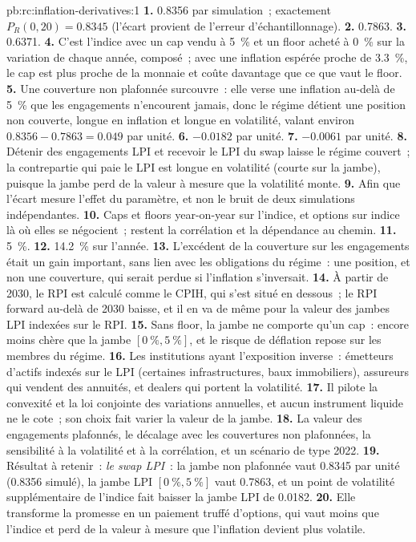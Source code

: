 \begin{solution}{pb:rc:inflation-derivatives:1}
\textbf{1.} 0.8356 par simulation~; exactement $P_R(0,20) = 0.8345$ (l'écart provient de
l'erreur d'échantillonnage).
\textbf{2.} 0.7863.
\textbf{3.} 0.6371.
\textbf{4.} C'est l'indice avec un cap vendu à 5~\% et un floor acheté à 0~\% sur la variation de chaque année,
composé~; avec une inflation espérée proche de 3.3~\%, le cap est plus proche de la monnaie et coûte davantage que
ce que vaut le floor.
\textbf{5.} Une couverture non plafonnée surcouvre~: elle verse une inflation au-delà de 5~\% que les engagements n'encourent jamais,
donc le régime détient une position non couverte, longue en inflation et longue en volatilité, valant environ
$0.8356-0.7863 = 0.049$ par unité.
\textbf{6.} $-0.0182$ par unité.
\textbf{7.} $-0.0061$ par unité.
\textbf{8.} Détenir des engagements LPI et recevoir le LPI du swap laisse le régime couvert~; la
contrepartie qui paie le LPI est longue en volatilité (courte sur la jambe), puisque la jambe perd de la valeur à mesure que
la volatilité monte.
\textbf{9.} Afin que l'écart mesure l'effet du paramètre, et non le bruit de deux
simulations indépendantes.
\textbf{10.} Caps et floors year-on-year sur l'indice, et options sur indice là où elles se négocient~;
restent la corrélation et la dépendance au chemin.
\textbf{11.} 5~\%.
\textbf{12.} 14.2~\% sur l'année.
\textbf{13.} L'excédent de la couverture sur les engagements était un gain important, sans lien avec les obligations du
régime~: une position, et non une couverture, qui serait perdue si l'inflation s'inversait.
\textbf{14.} À partir de 2030, le RPI est calculé comme le CPIH, qui s'est situé en dessous~; le RPI forward
au-delà de 2030 baisse, et il en va de même pour la valeur des jambes LPI indexées sur le RPI.
\textbf{15.} Sans floor, la jambe ne comporte qu'un cap~: encore moins chère que la
jambe $[0~\%,5~\%]$, et le risque de déflation repose sur les membres du régime.
\textbf{16.} Les institutions ayant l'exposition inverse~: émetteurs d'actifs indexés sur le LPI (certaines
infrastructures, baux immobiliers), assureurs qui vendent des annuités, et dealers qui portent
la volatilité.
\textbf{17.} Il pilote la convexité et la loi conjointe des variations annuelles, et aucun instrument liquide
ne le cote~; son choix fait varier la valeur de la jambe.
\textbf{18.} La valeur des engagements plafonnés, le décalage avec les couvertures non plafonnées, la
sensibilité à la volatilité et à la corrélation, et un scénario de type 2022.
\textbf{19.} Résultat à retenir~: \emph{le swap LPI}~: la jambe non plafonnée vaut 0.8345 par unité (0.8356
simulé), la jambe LPI $[0~\%,5~\%]$ vaut 0.7863, et un point de volatilité supplémentaire de l'indice fait baisser la jambe LPI de
0.0182.
\textbf{20.} Elle transforme la promesse en un paiement truffé d'options, qui vaut moins que l'indice
et perd de la valeur à mesure que l'inflation devient plus volatile.
\end{solution}

